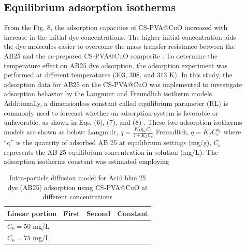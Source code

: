 \documentclass[final,5p,times,twocolumn,authoryear]{elsarticle}
\begin{document}
\subsection{Equilibrium adsorption isotherms}
From the Fig. 8, the adsorption capacities of CS-PVA@CuO increased with increase in the initial dye concentrations. The higher initial concentration aids the dye molecules easier to overcome the mass transfer resistance between the AB25 and the as-prepared CS-PVA@CuO composite \cite{42}. To determine the temperature effect on AB25 dye adsorption, the adsorption experiment was performed at different temperatures (303, 308, and 313 K). In this study, the adsorption data for AB25 on the CS-PVA@CuO was implemented to investigate adsorption behavior by the Langmuir and Freundlich isotherm models. Additionally, a dimensionless constant called equilibrium parameter (RL) is commonly used to forecast whether an adsorption system is favorable or unfavorable, as shown in Eqs. (6), (7), and (8) \cite{42}. These two adsorption isotherms models are shown as below:
Langmuir, $q = \frac{K_{L}q_{m}C_{e}}{1 + K_{L}C_{e}}$
Freundlich, $q = K_{f} C_{e}^{n_{e}}$
where ``q'' is the quantity of adsorbed AB 25 at equilibrium settings (mg/g), $C_{e}$ represents the AB 25 equilibrium concentration in solution (mg/L). The adsorption isotherms constant was estimated employing
\begin{table}[htbp]
\centering
\caption{Intra-particle diffusion model for Acid blue 25 dye (AB25) adsorption using CS-PVA@CuO at different concentrations}
\label{tab:label}
\begin{tabular}{llll}
\hline
Linear portion & First & Second & Constant \\
\hline
$C_{0} = 50$ mg/L & & & \\
$C_{0} = 75$ mg/L & & & \\
\hline
\end{tabular}
\end{table}
\end{document}
